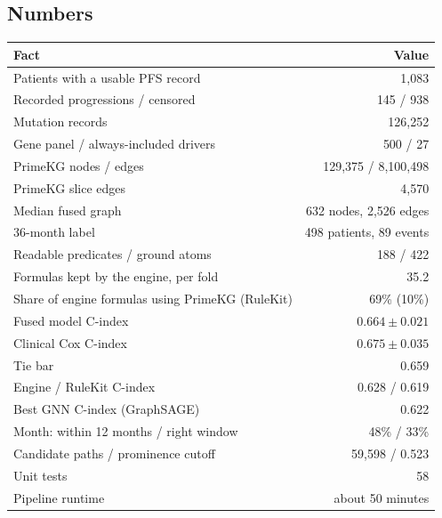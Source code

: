 \documentclass[11pt,a4paper]{article}
\begin{document}
\subsection{Numbers}
\begin{center}
\begin{tabular}{p{9.5cm}r}
\toprule
Fact & Value \\
\midrule
Patients with a usable PFS record & 1,083 \\
Recorded progressions / censored & 145 / 938 \\
Mutation records & 126,252 \\
Gene panel / always-included drivers & 500 / 27 \\
PrimeKG nodes / edges & 129,375 / 8,100,498 \\
PrimeKG slice edges & 4,570 \\
Median fused graph & 632 nodes, 2,526 edges \\
36-month label & 498 patients, 89 events \\
Readable predicates / ground atoms & 188 / 422 \\
Formulas kept by the engine, per fold & 35.2 \\
Share of engine formulas using PrimeKG (RuleKit) & 69\% (10\%) \\
Fused model C-index & $0.664\pm0.021$ \\
Clinical Cox C-index & $0.675\pm0.035$ \\
Tie bar & 0.659 \\
Engine / RuleKit C-index & 0.628 / 0.619 \\
Best GNN C-index (GraphSAGE) & 0.622 \\
Month: within 12 months / right window & 48\% / 33\% \\
Candidate paths / prominence cutoff & 59,598 / 0.523 \\
Unit tests & 58 \\
Pipeline runtime & about 50 minutes \\
\bottomrule
\end{tabular}
\end{center}
\end{document}
